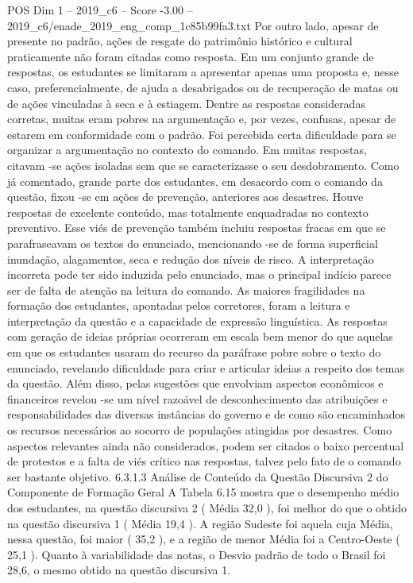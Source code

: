 \begin{textsample}{POS Dim 1 – 2019\_c6 – Score -3.00 – 2019\_c6/enade\_2019\_eng\_comp\_1c85b99fa3.txt}
Por outro lado, apesar de presente no padrão, ações de resgate do patrimônio histórico e cultural praticamente não foram citadas como resposta.
Em um conjunto grande de respostas, os estudantes se limitaram a apresentar apenas uma proposta e, nesse caso, preferencialmente, de ajuda a desabrigados ou de recuperação de matas ou de ações vinculadas à seca e à estiagem.
Dentre as respostas consideradas corretas, muitas eram pobres na argumentação e, por vezes, confusas, apesar de estarem em conformidade com o padrão.
Foi percebida certa dificuldade para se organizar a argumentação no contexto do comando.
Em muitas respostas, citavam -se ações isoladas sem que se caracterizasse o seu desdobramento.
Como já comentado, grande parte dos estudantes, em desacordo com o comando da questão, fixou -se em ações de prevenção, anteriores aos desastres.
Houve respostas de excelente conteúdo, mas totalmente enquadradas no contexto preventivo.
Esse viés de prevenção também incluiu respostas fracas em que se parafraseavam os textos do enunciado, mencionando -se de forma superficial inundação, alagamentos, seca e redução dos níveis de risco.
A interpretação incorreta pode ter sido induzida pelo enunciado, mas o principal indício parece ser de falta de atenção na leitura do comando.
As maiores fragilidades na formação dos estudantes, apontadas pelos corretores, foram a leitura e interpretação da questão e a capacidade de expressão linguística.
As respostas com geração de ideias próprias ocorreram em escala bem menor do que aquelas em que os estudantes usaram do recurso da paráfrase pobre sobre o texto do enunciado, revelando dificuldade para criar e articular ideias a respeito dos temas da questão.
Além disso, pelas sugestões que envolviam aspectos econômicos e financeiros revelou -se um nível razoável de desconhecimento das atribuições e responsabilidades das diversas instâncias do governo e de como são encaminhados os recursos necessários ao socorro de populações atingidas por desastres.
Como aspectos relevantes ainda não considerados, podem ser citados o baixo percentual de protestos e a falta de viés crítico nas respostas, talvez pelo fato de o comando ser bastante objetivo. 6.3.1.3 Análise de Conteúdo da Questão Discursiva 2 do Componente de Formação Geral A Tabela 6.15 mostra que o desempenho médio dos estudantes, na questão discursiva 2 ( Média 32,0 ), foi melhor do que o obtido na questão discursiva 1 ( Média 19,4 ).
A região Sudeste foi aquela cuja Média, nessa questão, foi maior ( 35,2 ), e a região de menor Média foi a Centro-Oeste ( 25,1 ).
Quanto à variabilidade das notas, o Desvio padrão de todo o Brasil foi 28,6, o mesmo obtido na questão discursiva 1.

\end{textsample}
